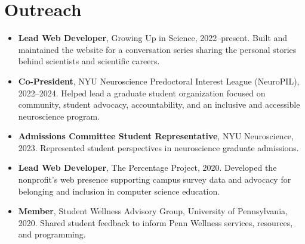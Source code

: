 \documentclass[10pt]{article}
\begin{document}
\section{Outreach}

\begin{itemize}
\item \textbf{Lead Web Developer}, Growing Up in Science, 2022--present. Built and maintained the website for a conversation series sharing the personal stories behind scientists and scientific careers.
\item \textbf{Co-President}, NYU Neuroscience Predoctoral Interest League (NeuroPIL), 2022--2024. Helped lead a graduate student organization focused on community, student advocacy, accountability, and an inclusive and accessible neuroscience program.
\item \textbf{Admissions Committee Student Representative}, NYU Neuroscience, 2023. Represented student perspectives in neuroscience graduate admissions.
\item \textbf{Lead Web Developer}, The Percentage Project, 2020. Developed the nonprofit’s web presence supporting campus survey data and advocacy for belonging and inclusion in computer science education.
\item \textbf{Member}, Student Wellness Advisory Group, University of Pennsylvania, 2020. Shared student feedback to inform Penn Wellness services, resources, and programming.
\end{itemize}
\end{document}
